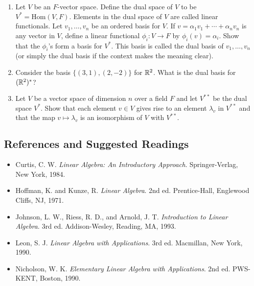 {\begin{enumerate}
\begin{enumerate}
   \bf\item\rm
Let $V$ be an $F$-vector space.  Define the {\bfi dual
space\/} of $V$ 
to be $V^\ast = \mbox{Hom}(V, F)$\label{notedual}. Elements in the dual space of $V$ are
called {\bfi linear functionals}.  Let $v_1,
\ldots, v_n$ be an ordered basis for $V$. If $v = \alpha_1 v_1 +
\cdots + \alpha_n v_n$ is any vector in $V$, define a linear
functional  $\phi_i : V \rightarrow F$ by $\phi_i (v) = \alpha_i$.
Show that the $\phi_i$'s form a basis for $V^\ast$.  This basis is
called the {\bfi dual basis\/} of $v_1, \ldots, v_n$ (or simply the dual
basis if the context makes the meaning clear).  
 

   \bf\item\rm
Consider the basis $\{ (3, 1), (2, -2) \}$ for ${\Bbb R}^2$. What is
the dual basis for $({\Bbb R}^2)^\ast$? 
 
   \bf\item\rm
Let $V$ be a vector space of dimension $n$ over a field $F$ and let
$V^{\ast \ast}$ be the dual space $V^\ast$.  Show that each element $v
\in V$ gives rise to an element $\lambda_v$ in $V^{\ast \ast}$ and
that the map $v \mapsto \lambda_v$ is an isomorphism of $V$ with
$V^{\ast \ast}$. 

\end{enumerate}
 

\end{enumerate}
}


 
\subsection*{References and Suggested Readings}
 

{\small
\begin{itemize}
 
\item[{\bf [1]}]  %
Curtis, C. W. {\it Linear Algebra: An Introductory Approach}.
Springer-Verlag, New York, 1984.
 
\item[{\bf [2]}]
Hoffman, K. and Kunze, R. {\it Linear Algebra}. 2nd ed.
Prentice-Hall, Englewood Cliffs, NJ, 1971.

\item[{\bf [3]}]
Johnson, L. W., Riess, R. D., and Arnold, J. T. {\it Introduction to
Linear Algebra}. 3rd ed. Addison-Wesley, Reading, MA, 1993.
 
\item[{\bf [4]}]
Leon, S. J. {\it Linear Algebra with Applications}. 3rd ed.
Macmillan, New York, 1990.
 
\item[{\bf [5]}]
Nicholson, W. K. {\it Elementary Linear Algebra with Applications}.
2nd ed. PWS-KENT, Boston, 1990.
 

\end{itemize}
}


